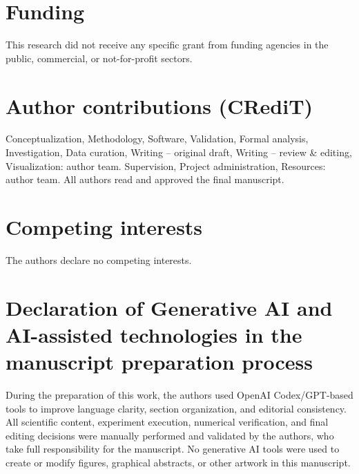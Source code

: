 \documentclass[5p,twocolumn,a4paper]{elsarticle}
\begin{document}
\section*{Funding}
This research did not receive any specific grant from funding agencies in the public, commercial, or not-for-profit sectors.

\section*{Author contributions (CRediT)}
Conceptualization, Methodology, Software, Validation, Formal analysis, Investigation, Data curation, Writing -- original draft, Writing -- review \& editing, Visualization: author team. Supervision, Project administration, Resources: author team. All authors read and approved the final manuscript.

\section*{Competing interests}
The authors declare no competing interests.

\section*{Declaration of Generative AI and AI-assisted technologies in the manuscript preparation process}
During the preparation of this work, the authors used OpenAI Codex/GPT-based tools to improve language clarity, section organization, and editorial consistency. All scientific content, experiment execution, numerical verification, and final editing decisions were manually performed and validated by the authors, who take full responsibility for the manuscript. No generative AI tools were used to create or modify figures, graphical abstracts, or other artwork in this manuscript.



\end{document}
